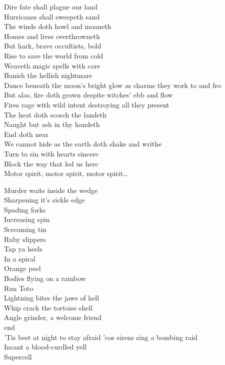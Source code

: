 Dire fate shall plague our land \\
Hurricanes shall sweepeth sand \\
The winds doth howl and moaneth \\
Homes and lives overthrowneth \\
But hark, brave occultists, bold \\
Rise to save the world from cold \\
Weaveth magic spells with care \\
Banish the hellish nightmare \\

Dance beneath the moon's bright glow as charms they work to and fro \\
But alas, fire doth grown despite witches' ebb and flow \\
Fires rage with wild intent destroying all they present \\
The heat doth scorch the landeth \\
Naught but ash in thy handeth \\

End doth near \\
We cannot hide as the earth doth shake and writhe \\
Turn to sin with hearts sincere \\
Block the way that led us here \\

Motor spirit, motor spirit, motor spirit… \\



Murder waits inside the wedge \\
Sharpening it's sickle edge \\
Spading forks \\
Increasing spin \\
Screaming tin \\
Ruby slippers \\
Tap ya heels \\
In a spiral \\
Orange peel \\
Bodies flying on a rainbow \\
Run Toto \\
Lightning bites the jaws of hell \\
Whip crack the tortoise shell \\
Angle grinder, a welcome friend \\
 end \\
'Tis best at night to stay afraid 'cos sirens sing a bombing raid \\
Incant a blood-curdled yell \\
Supercell \\

